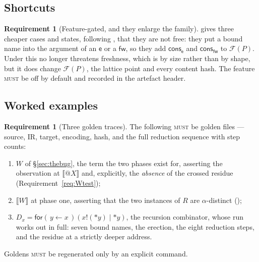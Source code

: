 \documentclass[11pt,a4paper]{article}
\makeatletter
\newcommand{\MUST}{\textsc{must}}
\newcommand{\quo}[1]{@#1}
\newcommand{\drp}[1]{{*}#1}
\newcommand{\inp}[3]{\mathsf{for}(\,#1 \leftarrow #2\,)#3}
\newcommand{\out}[2]{#1!(#2)}
\newcommand{\enc}[1]{\llbracket #1 \rrbracket}
\newcommand{\fw}{\mathsf{fw}}
\newcommand{\ev}{\mathsf{e}}
\newcommand{\cons}{\mathsf{cons}}
\theoremstyle{definition}
\newtheorem{requirement}[definition]{Requirement}
\theoremstyle{plain}
\makeatother
\begin{document}
\subsection{Shortcuts}

\begin{requirement}[Feature-gated, and they enlarge the family]
\label{req:shortcuts}
\cite[Rem.~6.4]{draft3} gives three cheaper cases and states, following
\cite[Rem.~3.13]{draft3}, that they are not free: they put a bound name into
the argument of an $\ev$ or a $\fw$, so they add $\cons_{\ev}$ and
$\cons_{\fw}$ to $\mathcal{F}(P)$. Under
\cite[Lem.~6.14]{draft3} this no longer threatens freshness, which is by size
rather than by shape, but it does change $\mathcal{F}(P)$, the lattice point
and every content hash. The feature \MUST{} be off by default and recorded in
the artefact header.
\end{requirement}

\subsection{Worked examples}

\begin{requirement}[Three golden traces]\label{req:golden}
The following \MUST{} be golden files --- source, IR, target, encoding, hash,
and the full reduction sequence with step counts:
\begin{enumerate}[leftmargin=1.8em,label=(\roman*)]
\item $W$ of \S\ref{sec:thebug}, the term the two phases exist for, asserting
the observation at $\enc{\quo{X}}$ and, explicitly, the \emph{absence} of the
crossed residue (Requirement~\ref{req:Wtest});
\item $\enc{W}$ at phase one, asserting that the two instances of $R$ are
$\alpha$-distinct (\cite[Ex.~6.5]{draft3});
\item $D_{x} = \inp{y}{x}{(\out{x}{\drp{y}} \mid \drp{y})}$, the recursion
combinator, whose run \cite[Ex.~6.9]{draft3} works out in full: seven bound
names, the erection, the eight reduction steps, and the residue at a strictly
deeper address.
\end{enumerate}
Goldens \MUST{} be regenerated only by an explicit command.
\end{requirement}
\end{document}
